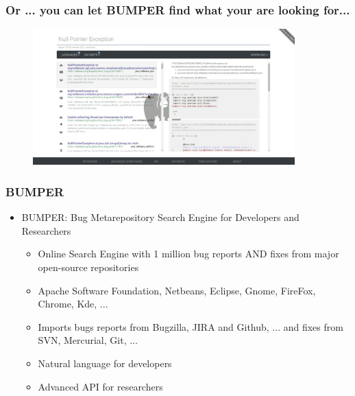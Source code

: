 \documentclass{beamer}
\begin{document}
\begin{frame}

  \frametitle{Or ... you can let BUMPER find what your are looking for...}

  \begin{figure}
    \centering
    \includegraphics[width=0.9\textwidth]{../media/interface2.png}
  \end{figure}

\end{frame}


\begin{frame}

\frametitle{BUMPER}
\begin{itemize}
\item BUMPER: Bug Metarepository Search Engine for Developers and Researchers
\begin{itemize}
\item Online Search Engine with 1 million bug reports AND fixes from major open-source repositories
\item Apache Software Foundation, Netbeans, Eclipse, Gnome, FireFox, Chrome, Kde, ...
\item Imports bugs reports from Bugzilla, JIRA and Github, ... and fixes from SVN, Mercurial, Git, ...
\item Natural language for developers
\item Advanced API for researchers
\end{itemize}

\end{itemize}

\end{frame}
\end{document}
